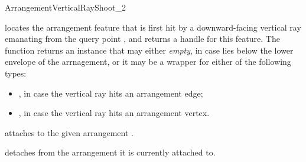 \begin{ccRefConcept}{ArrangementVerticalRayShoot_2}
  {locates the arrangement feature that is first hit by a downward-facing
   vertical ray emanating from the query point ,
   and returns a handle for this feature.
   The function returns an  instance that may either {\sl empty},
   in case  lies below the lower envelope of the arrnagement, or it
   may be a wrapper for either of the following types:
   \begin{itemize}
   \item {}, in case the vertical
         ray hits an arrangement edge;
   \item {}, in case the vertical
         ray hits an arrangement vertex.
   \end{itemize}
   }

\ccOperations

  {attaches \ccVar{} to the given arrangement .}

  {detaches \ccVar{} from the arrangement it is currently attached to.}

\ccHasModels

\\
 \\

\end{ccRefConcept}

\ccRefPageEnd
